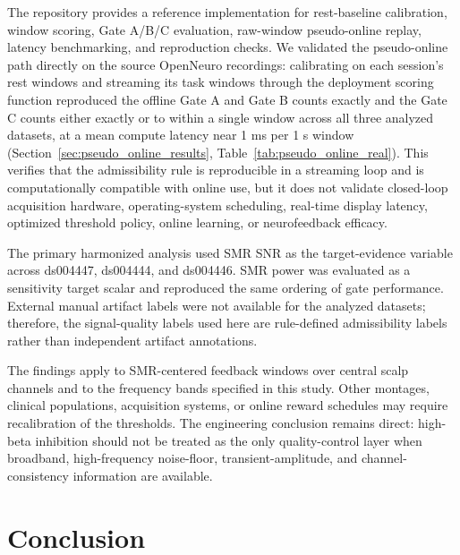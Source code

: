 \documentclass[preprint,12pt]{elsarticle}
\begin{document}
The repository provides a reference implementation for rest-baseline calibration, window scoring, Gate A/B/C evaluation, raw-window pseudo-online replay, latency benchmarking, and reproduction checks. We validated the pseudo-online path directly on the source OpenNeuro recordings: calibrating on each session's rest windows and streaming its task windows through the deployment scoring function reproduced the offline Gate A and Gate B counts exactly and the Gate C counts either exactly or to within a single window across all three analyzed datasets, at a mean compute latency near 1 ms per 1 s window (Section~\ref{sec:pseudo_online_results}, Table~\ref{tab:pseudo_online_real}). This verifies that the admissibility rule is reproducible in a streaming loop and is computationally compatible with online use, but it does not validate closed-loop acquisition hardware, operating-system scheduling, real-time display latency, optimized threshold policy, online learning, or neurofeedback efficacy.

The primary harmonized analysis used SMR SNR as the target-evidence variable across ds004447, ds004444, and ds004446. SMR power was evaluated as a sensitivity target scalar and reproduced the same ordering of gate performance. External manual artifact labels were not available for the analyzed datasets; therefore, the signal-quality labels used here are rule-defined admissibility labels rather than independent artifact annotations.

The findings apply to SMR-centered feedback windows over central scalp channels and to the frequency bands specified in this study. Other montages, clinical populations, acquisition systems, or online reward schedules may require recalibration of the thresholds. The engineering conclusion remains direct: high-beta inhibition should not be treated as the only quality-control layer when broadband, high-frequency noise-floor, transient-amplitude, and channel-consistency information are available.

\section{Conclusion}
\end{document}
